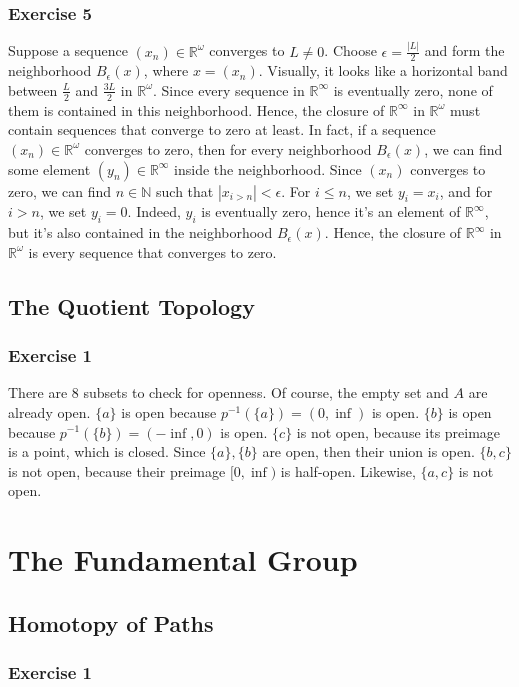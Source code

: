 \documentclass{book}
\begin{document}
\subsection*{Exercise 5}
Suppose a sequence $(x_n) \in \mathbb{R}^\omega$ converges to $L \neq 0$. Choose $\epsilon = \frac{|L|}{2}$ and form the neighborhood $B_\epsilon (x)$, where $x = (x_n)$. Visually, it looks like a horizontal band between $\frac{L}{2}$ and $\frac{3L}{2}$ in $\mathbb{R}^\omega$. Since every sequence in $\mathbb{R}^\infty$ is eventually zero, none of them is contained in this neighborhood. Hence, the closure of $\mathbb{R}^\infty$ in $\mathbb{R}^\omega$ must contain sequences that converge to zero at least. In fact, if a sequence $(x_n) \in \mathbb{R}^\omega$ converges to zero, then for every neighborhood $B_\epsilon (x)$, we can find some element $(y_n) \in \mathbb{R}^\infty$ inside the neighborhood. Since $(x_n)$ converges to zero, we can find $n \in \mathbb{N}$ such that $|x_{i > n}| < \epsilon$. For $i \leq n$, we set $y_i = x_i$, and for $i > n$, we set $y_i = 0$. Indeed, $y_i$ is eventually zero, hence it's an element of $\mathbb{R}^\infty$, but it's also contained in the neighborhood $B_\epsilon(x)$. Hence, the closure of $\mathbb{R}^\infty$ in $\mathbb{R}^\omega$ is every sequence that converges to zero.

\section{The Quotient Topology}

\subsection*{Exercise 1}
There are 8 subsets to check for openness. Of course, the empty set and $A$ are already open. $\{ a \}$ is open because $p^{-1}(\{ a \}) = (0, \inf)$ is open. $\{ b \}$ is open because $p^{-1}(\{ b \}) = (-\inf, 0)$ is open. $\{ c \}$ is not open, because its preimage is a point, which is closed. Since $\{ a \}, \{ b \}$ are open, then their union is open. $\{ b, c \}$ is not open, because their preimage $[0, \inf)$ is half-open. Likewise, $\{ a, c \}$ is not open.

\chapter{The Fundamental Group}

\section{Homotopy of Paths}

\subsection*{Exercise 1}
\end{document}
